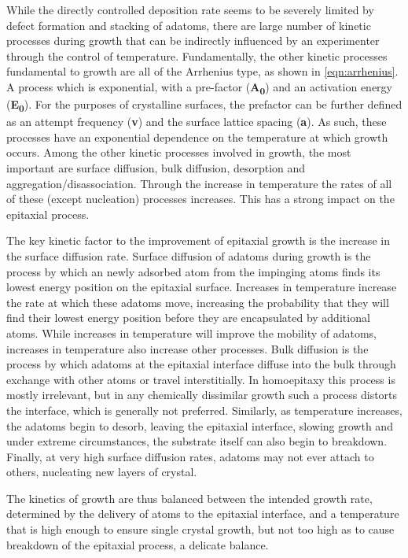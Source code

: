 While the directly controlled deposition rate seems to be severely limited by defect formation and stacking of adatoms, there are large number of kinetic processes during growth that can be indirectly influenced by an experimenter through the control of temperature. Fundamentally, the other kinetic processes fundamental to growth are all of the Arrhenius type, as shown in \cref{eqn:arrhenius}. A process which is exponential, with a pre-factor (\textbf{A\textsubscript{0}}) and an activation energy (\textbf{E\textsubscript{0}}). For the purposes of crystalline surfaces, the prefactor can be further defined as an attempt frequency (\textbf{v}) and the surface lattice spacing (\textbf{a})\cite{Einax2013}. As such, these processes have an exponential dependence on the temperature at which growth occurs. Among the other kinetic processes involved in growth, the most important are surface diffusion, bulk diffusion, desorption and aggregation/disassociation. Through the increase in temperature the rates of all of these (except nucleation) processes increases. This has a strong impact on the epitaxial process. 

The key kinetic factor to the improvement of epitaxial growth is the increase in the surface diffusion rate. Surface diffusion of adatoms during growth is the process by which an newly adsorbed atom from the impinging atoms finds its lowest energy position on the epitaxial surface. Increases in temperature increase the rate at which these adatoms move, increasing the probability that they will find their lowest energy position before they are encapsulated by additional atoms. While increases in temperature will improve the mobility of adatoms, increases in temperature also increase other processes. Bulk diffusion is the process by which adatoms at the epitaxial interface diffuse into the bulk through exchange with other atoms or travel interstitially. In homoepitaxy this process is mostly irrelevant, but in any chemically dissimilar growth such a process distorts the interface, which is generally not preferred. Similarly, as temperature increases, the adatoms begin to desorb, leaving the epitaxial interface, slowing growth and under extreme circumstances, the substrate itself can also begin to breakdown. Finally, at very high surface diffusion rates, adatoms may not ever attach to others, nucleating new layers of crystal.

The kinetics of growth are thus balanced between the intended growth rate, determined by the delivery of atoms to the epitaxial interface, and a temperature that is high enough to ensure single crystal growth, but not too high as to cause breakdown of the epitaxial process, a delicate balance.

